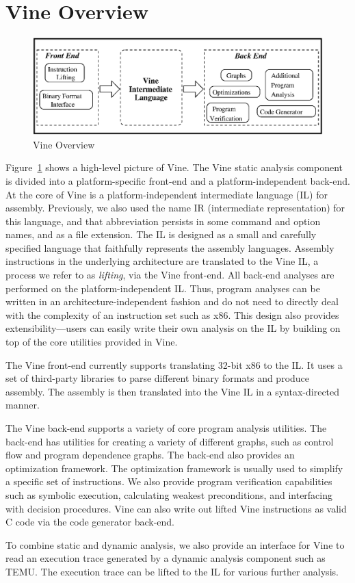 \section{Vine Overview}

\begin{figure}
\centering
\includegraphics[width=.6\textwidth]{vine-components}
\caption{Vine Overview}
\label{fig:vine-components}
\end{figure}

Figure~\ref{fig:vine-components} shows a high-level picture of
Vine. The Vine static analysis component is divided into a
platform-specific front-end and a platform-independent back-end.  At
the core of Vine is a platform-independent intermediate language
(IL) for assembly.
Previously, we also used the name IR (intermediate representation)
for this language, and that abbreviation persists in some command and
option names, and as a file extension.
The IL is designed as a small and carefully
specified language that faithfully represents the assembly
languages. Assembly instructions in the underlying architecture are
translated to the Vine IL, a process we refer to as {\em lifting}, via
the Vine front-end.  All back-end
analyses are performed on the platform-independent IL. Thus, program
analyses can be written in an architecture-independent fashion and
do not need to directly deal with the complexity of an instruction
set such as x86. This design also provides extensibility---users can
easily write their own analysis on the IL by building on top of the
core utilities provided in Vine.

The Vine front-end currently supports translating 32-bit x86
to the IL. It uses a set of
third-party libraries to parse different binary formats and
produce assembly. The assembly is then translated into the Vine IL in
a syntax-directed manner.

The Vine back-end supports a variety of core program analysis
utilities.  The back-end has utilities for creating a variety of
different graphs, such as control flow and program dependence graphs.
The back-end also provides an optimization framework. The optimization
framework is usually used to simplify a specific set of
instructions. We also provide program verification capabilities such
as symbolic execution, calculating weakest preconditions, and
interfacing with decision procedures.  Vine can also write out lifted
Vine instructions as valid C code via the code generator back-end.

To combine static and dynamic analysis, we also provide an interface
for Vine to read an execution trace generated by a dynamic analysis
component such as TEMU. The execution trace can be lifted to the IL
for various further analysis.
